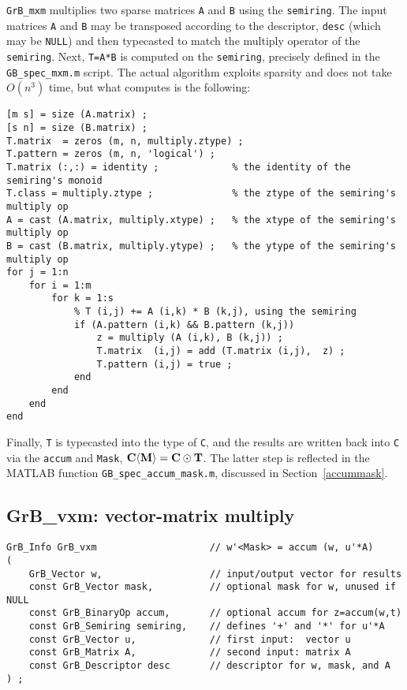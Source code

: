 \documentclass[12pt]{article}
\begin{document}
\verb'GrB_mxm' multiplies two sparse matrices \verb'A' and \verb'B' using the
\verb'semiring'.  The input matrices \verb'A' and \verb'B' may be transposed
according to the descriptor, \verb'desc' (which may be \verb'NULL') and then
typecasted to match the multiply operator of the \verb'semiring'.  Next,
\verb'T=A*B' is computed on the \verb'semiring', precisely defined in the
\verb'GB_spec_mxm.m' script.  The actual algorithm exploits sparsity and does
not take $O(n^3)$ time, but what computes is the following: 

{\footnotesize
\begin{verbatim}
[m s] = size (A.matrix) ;
[s n] = size (B.matrix) ;
T.matrix  = zeros (m, n, multiply.ztype) ;
T.pattern = zeros (m, n, 'logical') ;
T.matrix (:,:) = identity ;             % the identity of the semiring's monoid
T.class = multiply.ztype ;              % the ztype of the semiring's multiply op
A = cast (A.matrix, multiply.xtype) ;   % the xtype of the semiring's multiply op
B = cast (B.matrix, multiply.ytype) ;   % the ytype of the semiring's multiply op
for j = 1:n
    for i = 1:m
        for k = 1:s
            % T (i,j) += A (i,k) * B (k,j), using the semiring
            if (A.pattern (i,k) && B.pattern (k,j))
                z = multiply (A (i,k), B (k,j)) ;
                T.matrix  (i,j) = add (T.matrix (i,j),  z) ;
                T.pattern (i,j) = true ;
            end
        end
    end
end \end{verbatim}}

Finally, \verb'T' is typecasted into the type of \verb'C', and the results are
written back into \verb'C' via the \verb'accum' and \verb'Mask', ${\bf C
\langle M \rangle  = C \odot T}$.  The latter step is reflected in the MATLAB
function \verb'GB_spec_accum_mask.m', discussed in Section~\ref{accummask}.

\newpage
\subsection{{\sf GrB\_vxm:} vector-matrix multiply} %
\label{vxm}

\begin{mdframed}[userdefinedwidth=6in]
{\footnotesize
\begin{verbatim}
GrB_Info GrB_vxm                    // w'<Mask> = accum (w, u'*A)
(
    GrB_Vector w,                   // input/output vector for results
    const GrB_Vector mask,          // optional mask for w, unused if NULL
    const GrB_BinaryOp accum,       // optional accum for z=accum(w,t)
    const GrB_Semiring semiring,    // defines '+' and '*' for u'*A
    const GrB_Vector u,             // first input:  vector u
    const GrB_Matrix A,             // second input: matrix A
    const GrB_Descriptor desc       // descriptor for w, mask, and A
) ;
\end{verbatim} } \end{mdframed}
\end{document}
